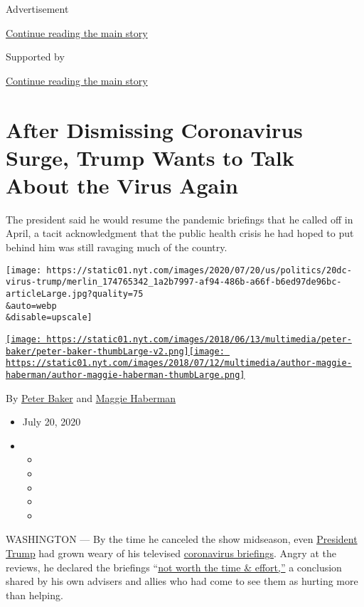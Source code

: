 Advertisement

\protect\hyperlink{after-top}{Continue reading the main story}

Supported by

\protect\hyperlink{after-sponsor}{Continue reading the main story}

\hypertarget{after-dismissing-coronavirus-surge-trump-wants-to-talk-about-the-virus-again}{%
\section{After Dismissing Coronavirus Surge, Trump Wants to Talk About
the Virus
Again}\label{after-dismissing-coronavirus-surge-trump-wants-to-talk-about-the-virus-again}}

The president said he would resume the pandemic briefings that he called
off in April, a tacit acknowledgment that the public health crisis he
had hoped to put behind him was still ravaging much of the country.

\texttt{[image: https://static01.nyt.com/images/2020/07/20/us/politics/20dc-virus-trump/merlin\_174765342\_1a2b7997-af94-486b-a66f-b6ed97de96bc-articleLarge.jpg?quality=75\\\&auto=webp\\\&disable=upscale]}

\href{https://www.nytimes.com/by/peter-baker}{\texttt{[image: https://static01.nyt.com/images/2018/06/13/multimedia/peter-baker/peter-baker-thumbLarge-v2.png]}}\href{https://www.nytimes.com/by/maggie-haberman}{\texttt{[image: https://static01.nyt.com/images/2018/07/12/multimedia/author-maggie-haberman/author-maggie-haberman-thumbLarge.png]}}

By \href{https://www.nytimes.com/by/peter-baker}{Peter Baker} and
\href{https://www.nytimes.com/by/maggie-haberman}{Maggie Haberman}

\begin{itemize}
\item
  July 20, 2020
\item
  \begin{itemize}
  \item
  \item
  \item
  \item
  \item
  \end{itemize}
\end{itemize}

WASHINGTON --- By the time he canceled the show midseason, even
\href{https://www.nytimes.com/2020/07/25/us/politics/trump-florida-convention.html}{President
Trump} had grown weary of his televised
\href{https://www.nytimes.com/2020/07/21/arts/television/trump-briefings.html}{coronavirus
briefings}. Angry at the reviews, he declared the briefings
``\href{https://twitter.com/realDonaldTrump/status/1254168730898173953}{not
worth the time \& effort,''} a conclusion shared by his own advisers and
allies who had come to see them as hurting more than helping.


